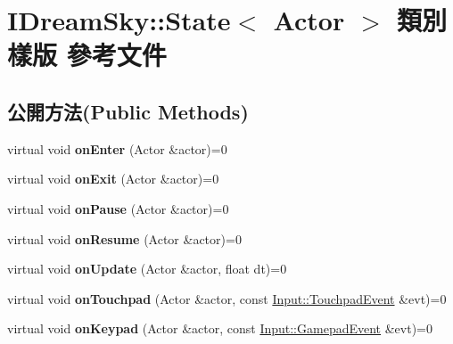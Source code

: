 \hypertarget{class_i_dream_sky_1_1_state}{}\section{I\+Dream\+Sky\+:\+:State$<$ Actor $>$ 類別 樣版 參考文件}
\label{class_i_dream_sky_1_1_state}
\subsection*{公開方法(Public Methods)}
\begin{DoxyCompactItemize}
\item 
virtual void {\bfseries on\+Enter} (Actor \&actor)=0\hypertarget{class_i_dream_sky_1_1_state_a8d70070ececeeb8fa6a96127cdb3fdb5}{}\label{class_i_dream_sky_1_1_state_a8d70070ececeeb8fa6a96127cdb3fdb5}

\item 
virtual void {\bfseries on\+Exit} (Actor \&actor)=0\hypertarget{class_i_dream_sky_1_1_state_a13901099617868a50d28cab42d36db5a}{}\label{class_i_dream_sky_1_1_state_a13901099617868a50d28cab42d36db5a}

\item 
virtual void {\bfseries on\+Pause} (Actor \&actor)=0\hypertarget{class_i_dream_sky_1_1_state_ab23bf81ede6a5f7d83627e8e055b3726}{}\label{class_i_dream_sky_1_1_state_ab23bf81ede6a5f7d83627e8e055b3726}

\item 
virtual void {\bfseries on\+Resume} (Actor \&actor)=0\hypertarget{class_i_dream_sky_1_1_state_a17f20ce36d6792ad64083396bde910c2}{}\label{class_i_dream_sky_1_1_state_a17f20ce36d6792ad64083396bde910c2}

\item 
virtual void {\bfseries on\+Update} (Actor \&actor, float dt)=0\hypertarget{class_i_dream_sky_1_1_state_a0e97f6bef228f791b06b135fa5582b4e}{}\label{class_i_dream_sky_1_1_state_a0e97f6bef228f791b06b135fa5582b4e}

\item 
virtual void {\bfseries on\+Touchpad} (Actor \&actor, const \hyperlink{class_i_dream_sky_1_1_input_1_1_touchpad_event}{Input\+::\+Touchpad\+Event} \&evt)=0\hypertarget{class_i_dream_sky_1_1_state_a4625bceeb5c98c0198f6635a1e1ecdcf}{}\label{class_i_dream_sky_1_1_state_a4625bceeb5c98c0198f6635a1e1ecdcf}

\item 
virtual void {\bfseries on\+Keypad} (Actor \&actor, const \hyperlink{class_i_dream_sky_1_1_input_1_1_gamepad_event}{Input\+::\+Gamepad\+Event} \&evt)=0\hypertarget{class_i_dream_sky_1_1_state_ad8aa65042217636d042b25c34bcf5078}{}\label{class_i_dream_sky_1_1_state_ad8aa65042217636d042b25c34bcf5078}


\end{DoxyCompactItemize}
